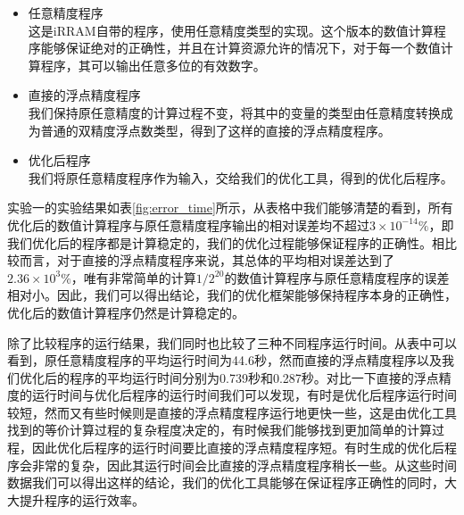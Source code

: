 \begin{itemize}
    \item {\kaishu 任意精度程序} \\
    这是iRRAM自带的程序，使用任意精度类型的实现。这个版本的数值计算程序能够保证绝对的正确性，并且在计算资源允许的情况下，对于每一个数值计算程序，其可以输出任意多位的有效数字。

    \item {\kaishu 直接的浮点精度程序} \\
    我们保持原任意精度的计算过程不变，将其中的变量的类型由任意精度转换成为普通的双精度浮点数类型，得到了这样的直接的浮点精度程序。

    \item {\kaishu 优化后程序} \\
    我们将原任意精度程序作为输入，交给我们的优化工具，得到的优化后程序。
\end{itemize}

实验一的实验结果如表\ref{fig:error_time}所示，从表格中我们能够清楚的看到，所有优化后的数值计算程序与原任意精度程序输出的相对误差均不超过$3 \times 10^{-14}\%$，即我们优化后的程序都是计算稳定的，我们的优化过程能够保证程序的正确性。相比较而言，对于直接的浮点精度程序来说，其总体的平均相对误差达到了$2.36\times 10^3\%$，唯有非常简单的计算$1/2^{20}$的数值计算程序与原任意精度程序的误差相对小。因此，我们可以得出结论，我们的优化框架能够保持程序本身的正确性，优化后的数值计算程序仍然是计算稳定的。

除了比较程序的运行结果，我们同时也比较了三种不同程序运行时间。从表中可以看到，原任意精度程序的平均运行时间为44.6秒，然而直接的浮点精度程序以及我们优化后的程序的平均运行时间分别为0.739秒和0.287秒。对比一下直接的浮点精度的运行时间与优化后程序的运行时间我们可以发现，有时是优化后程序运行时间较短，然而又有些时候则是直接的浮点精度程序运行地更快一些，这是由优化工具找到的等价计算过程的复杂程度决定的，有时候我们能够找到更加简单的计算过程，因此优化后程序的运行时间要比直接的浮点精度程序短。有时生成的优化后程序会非常的复杂，因此其运行时间会比直接的浮点精度程序稍长一些。从这些时间数据我们可以得出这样的结论，我们的优化工具能够在保证程序正确性的同时，大大提升程序的运行效率。

